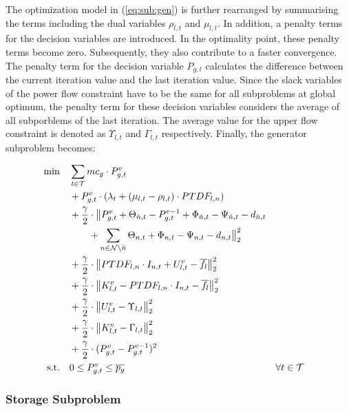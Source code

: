  The optimization model in (\ref{eq:sub:gen}) is further rearranged by summarising the terms including the dual variables $\rho_{l,t}$ and $\mu_{l,t}$. In addition, a penalty terms for the decision variables are introduced. In the optimality point, these penalty terms become zero. Subsequently, they also contribute to a faster convergence. The penalty term for the decision variable $P_{g,t}$ calculates the difference between the current iteration value and the last iteration value. Since the slack variables of the power flow constraint have to be the same for all subproblems at global optimum, the penalty term for these decision variables considers the average of all subporblems of the last iteration. The average value for the upper flow constraint is denoted as $\Upsilon_{l,t}$ and $\Gamma_{l,t}$ respectively. Finally, the generator subproblem becomes:
 
 \begin{subequations}
	\begin{align}
		 \min \quad & \sum_{t\in\mathcal{T}} mc_g \cdot P_{g,t}^v \label{eq:sub:gen-final}\\
		 & + P_{g,t}^v \cdot (\lambda_t + (\mu_{l,t} - \rho_{l,t}) \cdot PTDF_{l,n}) \nonumber \\ 
		 & + \frac{\gamma}{2} \cdot \big\| P_{g,t}^v + \Theta_{\breve{n},t} - P_{g,t}^{v-1} + \Phi_{\breve{n},t} - \Psi_{\breve{n},t} - d_{\breve{n},t} \nonumber \\
		 & \qquad + \sum_{n \in \mathcal{N} \setminus \breve{n}} \Theta_{n,t} + \Phi_{n,t} - \Psi_{n,t} - d_{n,t} \big\|^2_2 \nonumber \\
		 & + \frac{\gamma}{2} \cdot \big\| PTDF_{l,n} \cdot I_{n,t} + U_{l,t}^v - \overline{f_l} \big\|^2_2 \nonumber \\
		 & + \frac{\gamma}{2} \cdot \big\|K_{l,t}^v - PTDF_{l,n} \cdot I_{n,t} - \overline{f_l} \big\|^2_2 \nonumber \\
		 & + \frac{\gamma}{2} \cdot \big\|U_{l,t}^v - \Upsilon_{l,t}  \big\|^2_2 \nonumber\\
		 & + \frac{\gamma}{2} \cdot \big\|K_{l,t}^v - \Gamma_{l,t}  \big\|^2_2 \nonumber \\
		 & + \frac{\gamma}{2} \cdot (P_{g,t}^v - P_{g,t}^{v-1})^2 \nonumber \\
		 \text{s.t.} \quad & 0 \leq P_{g,t}^v \leq \overline{p_g} && \forall t \in \mathcal{T}
	\end{align}
\end{subequations}

\subsubsection*{Storage Subproblem}

